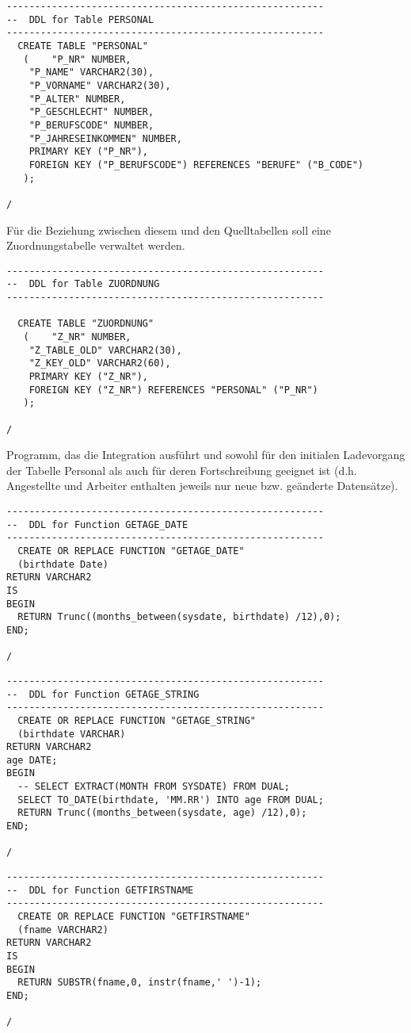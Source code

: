 \documentclass{scrartcl}
\begin{document}
\begin{lstlisting}
--------------------------------------------------------
--  DDL for Table PERSONAL
--------------------------------------------------------
  CREATE TABLE "PERSONAL" 
   (	"P_NR" NUMBER, 
	"P_NAME" VARCHAR2(30), 
	"P_VORNAME" VARCHAR2(30), 
	"P_ALTER" NUMBER, 
	"P_GESCHLECHT" NUMBER, 
	"P_BERUFSCODE" NUMBER, 
	"P_JAHRESEINKOMMEN" NUMBER,
	PRIMARY KEY ("P_NR"),
	FOREIGN KEY ("P_BERUFSCODE") REFERENCES "BERUFE" ("B_CODE")
   );

/
\end{lstlisting}
Für die Beziehung
zwischen diesem und den Quelltabellen soll eine Zuordnungstabelle verwaltet
werden.
\begin{lstlisting}
--------------------------------------------------------
--  DDL for Table ZUORDNUNG
--------------------------------------------------------

  CREATE TABLE "ZUORDNUNG" 
   (	"Z_NR" NUMBER, 
	"Z_TABLE_OLD" VARCHAR2(30), 
	"Z_KEY_OLD" VARCHAR2(60),
	PRIMARY KEY ("Z_NR"),
	FOREIGN KEY ("Z_NR") REFERENCES "PERSONAL" ("P_NR")
   );

/
\end{lstlisting}
Programm, das die Integration ausführt und sowohl für
den initialen Ladevorgang der Tabelle Personal als auch für deren Fortschreibung
geeignet ist (d.h. Angestellte und Arbeiter enthalten jeweils nur neue bzw. geänderte
Datensätze).
\begin{lstlisting}
--------------------------------------------------------
--  DDL for Function GETAGE_DATE
--------------------------------------------------------
  CREATE OR REPLACE FUNCTION "GETAGE_DATE" 
  (birthdate Date)
RETURN VARCHAR2
IS
BEGIN
  RETURN Trunc((months_between(sysdate, birthdate) /12),0);
END;

/
\end{lstlisting}

\begin{lstlisting}
--------------------------------------------------------
--  DDL for Function GETAGE_STRING
--------------------------------------------------------
  CREATE OR REPLACE FUNCTION "GETAGE_STRING" 
  (birthdate VARCHAR)
RETURN VARCHAR2
age DATE;
BEGIN
  -- SELECT EXTRACT(MONTH FROM SYSDATE) FROM DUAL;
  SELECT TO_DATE(birthdate, 'MM.RR') INTO age FROM DUAL;
  RETURN Trunc((months_between(sysdate, age) /12),0);
END;

/
\end{lstlisting}

\begin{lstlisting}
--------------------------------------------------------
--  DDL for Function GETFIRSTNAME
--------------------------------------------------------
  CREATE OR REPLACE FUNCTION "GETFIRSTNAME" 
  (fname VARCHAR2)
RETURN VARCHAR2
IS
BEGIN
  RETURN SUBSTR(fname,0, instr(fname,' ')-1);
END;

/
\end{lstlisting}
\end{document}
